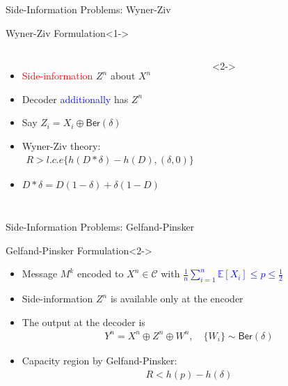 \documentclass[10pt]{beamer}
\def\side_information_path{../compound-codes/isit14/slides/Figures}
\newcommand{\expt}{\mathbb{E}}
\newlength\tikzwidth
\newlength\tikzheight
\begin{document}
\begin{frame}{Side-Information Problems: Wyner-Ziv}
  \begin{center}
    \scalebox{0.5}{}
  \end{center}
  \begin{block}{Wyner-Ziv Formulation}<1->
    \begin{columns}
      \begin{itemize}
      \item<1-> \textcolor{red}{Side-information} $Z^n$ about $X^n$
      \item<1-> Decoder \textcolor{blue}{additionally} has $Z^n$
      \item<1-> Say $Z_i = X_i \oplus \mathsf{Ber}(\delta)$
      \item<2-> Wyner-Ziv theory:
        \begin{align*}
          R > l.c.e\{h(D*\delta)-h(D), (\delta,0)\}
        \end{align*}
      \item<2-> $D*\delta=D(1-\delta)+\delta(1-D)$
      \end{itemize}
      <2->
      \setlength\tikzheight{3cm} 
      \setlength\tikzwidth{3.5cm} 
      \centering{}
    \end{columns}
  \end{block}
\end{frame}

\begin{frame}{Side-Information Problems: Gelfand-Pinsker}
  \begin{center}
    \scalebox{0.5}{}
  \end{center}
  \begin{block}{Gelfand-Pinsker Formulation}<2->
    \begin{itemize}
    \item<2-> Message $M^k$ encoded to $X^n \in \mathcal{C}$ with \textcolor{blue}{$\tfrac{1}{n} \sum_{i=1}^n \expt[X_i] \leq p \leq \frac{1}{2}$}
    \item<2-> Side-information $Z^n$ is available \alert{only at the encoder}
    \item<3-> The output at the decoder is
      \begin{align*}
        Y^n=X^n\oplus Z^n \oplus W^n, \quad \{W_i\} \sim \textsf{Ber}(\delta)
      \end{align*}
    \item<4-> Capacity region by Gelfand-Pinsker:
      \begin{align*}
        R < h(p) - h(\delta)
      \end{align*}
    \end{itemize}
  \end{block}
\end{frame}
\end{document}
